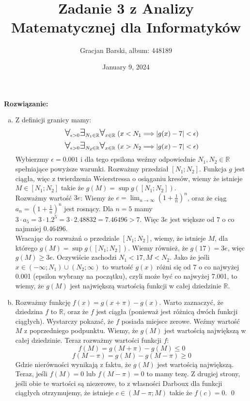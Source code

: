 \documentclass[11pt]{article}
\title{{\bf Zadanie 3 z Analizy Matematycznej dla Informatyków }}
\author{Gracjan Barski, album: 448189}
\date{January 9, 2024}
\newcommand{\R}{\mathbb{R}}
\newcommand{\Forall}{{\Large\mbox{$\forall$}}}
\newcommand{\Exists}{{\Large\mbox{$\exists$}}}
\begin{document}
\maketitle
\textbf{Rozwiązanie:}
\begin{enumerate}[(a)]
    \item Z definicji granicy mamy:
    $$\Forall_{\epsilon > 0} \Exists_{N_1 \in \R} \Forall_{x \in \R} \; (x < N_1 \Longrightarrow |g(x) - 7| < \epsilon) $$
    $$\Forall_{\epsilon > 0} \Exists_{N_2 \in \R} \Forall_{x \in \R} \; (x > N_2 \Longrightarrow |g(x) - 7| < \epsilon )$$
    Wybierzmy $\epsilon = 0.001$ i dla tego epsilona weźmy odpowiednie $N_1, N_2 \in \R$ spełniające powyższe warunki.
    Rozważmy przedział $[N_1; N_2]$. Funkcja $g$ jest ciągła, więc z twierdzenia Weierstressa o osiąganiu kresów, wiemy że istnieje $M \in [N_1; N_2]$ takie że $g(M) = \sup g([N_1; N_2])$. \\[5pt]
    Rozważmy wartość $3e$: Wiemy że $e = \lim_{n \to \infty} \left(1 + \frac{1}{n}\right)^n$, oraz że ciąg $a_n = \left(1 + \frac{1}{n}\right)^n$ jest rosnący. Dla $n = 5$ mamy $3 \cdot a_5 = 3 \cdot 1.2^5 = 3 \cdot 2.48832 = 7.46496 > 7$. Więc $3e$ jest większe od $7$ o co najmniej $0.46496$. \\[5pt]
    Wracając do rozważań o przedziale $[N_1; N_2]$, wiemy, że istnieje $M$, dla którego $g(M) = \sup g([N_1; N_2])$. Wiemy również, że $g(17) = 3e$, więc $g(M) \geq 3e$. Oczywiście zachodzi $N_1 < 17, M < N_2$. Jako że jeśli $x \in (-\infty; N_1) \cup (N_2; \infty)$ to wartość $g(x)$ różni się od 7 o co najwyżej 0.001 (epsilon wybrany na początku), czyli może być co najwyżej 7.001, to wiemy, że $g(M)$ jest największą wartością funkcji w całej dziedzinie $\R$.

    \item Rozważmy funkcję $f(x) = g(x + \pi) - g(x)$. Warto zaznaczyć, że dziedzina $f$ to $\R$, oraz że $f$ jest ciągła (ponieważ jest różnicą dwóch funkcji ciągłych). Wystarczy pokazać, że $f$ posiada miejsce zerowe. Weźmy wartość $M$ z poprzedniego podpunktu. Wiemy, że $g(M)$ jest wartością największą w całej dziedzinie. Teraz rozważmy wartości funkcji $f$:
    $$f(M) = g(M + \pi) - g(M) \leq 0$$
    $$f(M - \pi) = g(M) - g(M - \pi) \geq 0$$
    Gdzie nierówności wynikają z faktu, że $g(M)$ jest wartością największą. Teraz, jeśli $f(M) = 0$ lub $f(M - \pi) = 0$ to mamy tezę. Z drugiej strony, jeśli obie te wartości są niezerowe, to z własności Darboux dla funkcji ciągłych otrzymujemy, że istnieje $c \in (M - \pi; M)$ takie że $f(c) = 0$. \qed
\end{enumerate}
\end{document}
